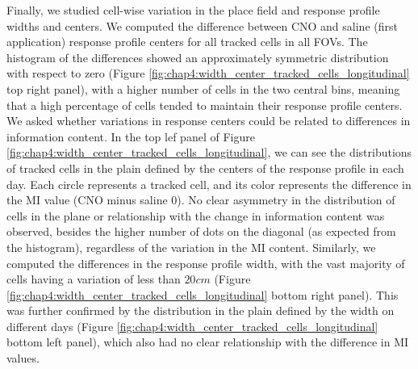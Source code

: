Finally, we studied cell-wise variation in the place field and response profile widths and centers.
We computed the difference between CNO and saline (first application) response profile centers for all tracked cells in all FOVs. 
The histogram of the differences showed an approximately symmetric distribution with respect to zero (Figure \ref{fig:chap4:width_center_tracked_cells_longitudinal} top right panel), with a higher number of cells in the two central bins, meaning that a high percentage of cells tended to maintain their response profile centers. 
We asked whether variations in response centers could be related to differences in information content. 
In the top lef panel of Figure \ref{fig:chap4:width_center_tracked_cells_longitudinal}, we can see the distributions of tracked cells in the plain defined by the centers of the response profile in each day.
Each circle represents a tracked cell, and its color represents the difference in the MI value (CNO minus saline 0).
No clear asymmetry in the distribution of cells in the plane or relationship with the change in information content was observed, besides the higher number of dots on the diagonal (as expected from the histogram), regardless of the variation in the MI content.
Similarly, we computed the differences in the response profile width, with the vast majority of cells having a variation of less than $20 cm$ (Figure \ref{fig:chap4:width_center_tracked_cells_longitudinal} bottom right panel).
This was further confirmed by the distribution in the plain defined by the width on different days (Figure \ref{fig:chap4:width_center_tracked_cells_longitudinal} bottom left panel), which also had no clear relationship with the difference in MI values. 
